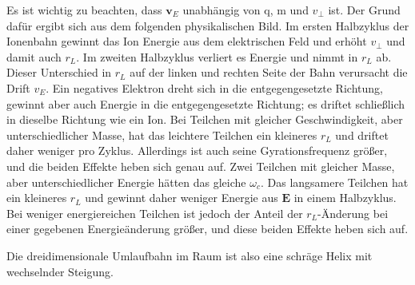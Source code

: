 \documentclass[
  a4paper,
  DIV=11]{scrreprt}
\begin{document}
Es ist wichtig zu beachten, dass \(\mathbf{v}_E\) unabhängig von q, m
und \(v_\perp\) ist. Der Grund dafür ergibt sich aus dem folgenden
physikalischen Bild. Im ersten Halbzyklus der Ionenbahn gewinnt das Ion
Energie aus dem elektrischen Feld und erhöht \(v_\perp\) und damit auch
\(r_L\). Im zweiten Halbzyklus verliert es Energie und nimmt in \(r_L\)
ab. Dieser Unterschied in \(r_L\) auf der linken und rechten Seite der
Bahn verursacht die Drift \(v_E\). Ein negatives Elektron dreht sich in
die entgegengesetzte Richtung, gewinnt aber auch Energie in die
entgegengesetzte Richtung; es driftet schließlich in dieselbe Richtung
wie ein Ion. Bei Teilchen mit gleicher Geschwindigkeit, aber
unterschiedlicher Masse, hat das leichtere Teilchen ein kleineres
\(r_L\) und driftet daher weniger pro Zyklus. Allerdings ist auch seine
Gyrationsfrequenz größer, und die beiden Effekte heben sich genau auf.
Zwei Teilchen mit gleicher Masse, aber unterschiedlicher Energie hätten
das gleiche \(\omega_c\). Das langsamere Teilchen hat ein kleineres
\(r_L\) und gewinnt daher weniger Energie aus \(\mathbf{E}\) in einem
Halbzyklus. Bei weniger energiereichen Teilchen ist jedoch der Anteil
der \(r_L\)-Änderung bei einer gegebenen Energieänderung größer, und
diese beiden Effekte heben sich auf.

Die dreidimensionale Umlaufbahn im Raum ist also eine schräge Helix mit
wechselnder Steigung.
\end{document}
